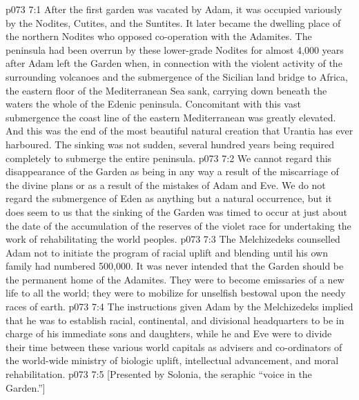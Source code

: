 \vs p073 7:1 After the first garden was vacated by Adam, it was occupied variously by the Nodites, Cutites, and the Suntites. It later became the dwelling place of the northern Nodites who opposed co\hyp{}operation with the Adamites. The peninsula had been overrun by these lower\hyp{}grade Nodites for almost 4,000 years after Adam left the Garden when, in connection with the violent activity of the surrounding volcanoes and the submergence of the Sicilian land bridge to Africa, the eastern floor of the Mediterranean Sea sank, carrying down beneath the waters the whole of the Edenic peninsula. Concomitant with this vast submergence the coast line of the eastern Mediterranean was greatly elevated. And this was the end of the most beautiful natural creation that Urantia has ever harboured. The sinking was not sudden, several hundred years being required completely to submerge the entire peninsula.
\vs p073 7:2 We cannot regard this disappearance of the Garden as being in any way a result of the miscarriage of the divine plans or as a result of the mistakes of Adam and Eve. We do not regard the submergence of Eden as anything but a natural occurrence, but it does seem to us that the sinking of the Garden was timed to occur at just about the date of the accumulation of the reserves of the violet race for undertaking the work of rehabilitating the world peoples.
\vs p073 7:3 \pc The Melchizedeks counselled Adam not to initiate the program of racial uplift and blending until his own family had numbered 500,000. It was never intended that the Garden should be the permanent home of the Adamites. They were to become emissaries of a new life to all the world; they were to mobilize for unselfish bestowal upon the needy races of earth.
\vs p073 7:4 The instructions given Adam by the Melchizedeks implied that he was to establish racial, continental, and divisional headquarters to be in charge of his immediate sons and daughters, while he and Eve were to divide their time between these various world capitals as advisers and co\hyp{}ordinators of the world\hyp{}wide ministry of biologic uplift, intellectual advancement, and moral rehabilitation.
\vsetoff
\vs p073 7:5 [Presented by Solonia, the seraphic “voice in the Garden.”]
\quizlink

